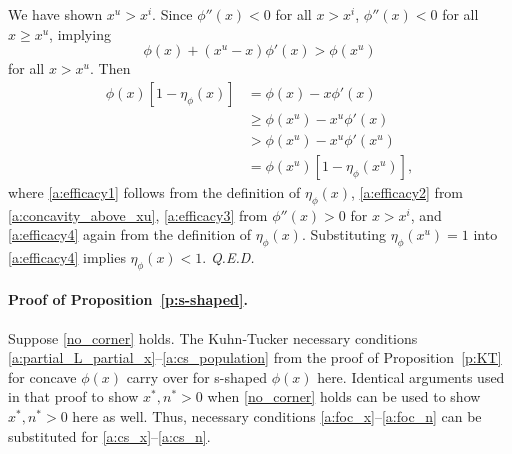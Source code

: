 \documentclass[12pt]{article}
\newcommand{\efficacy}{\phi}
\newcommand{\elasticity}[1]{\eta_{#1}}
\renewcommand{\qed}{{\it Q.E.D.}}
\begin{document}
We have shown $x^u > x^i$. Since $\efficacy''(x) < 0$ for all $x > x^i$, $\efficacy''(x) < 0$ for all $x \geq x^u$, implying 
\begin{equation}
\label{a:concavity_above_xu}
\efficacy(x) + (x^u - x) \efficacy'(x) > \efficacy(x^u)
\end{equation}
for all $x > x^u$. Then
\begin{align}
\efficacy(x) \left[ 1 - \elasticity{\efficacy}(x) \right] & = \efficacy(x) - x \efficacy'(x) \label{a:efficacy1} \\
& \geq \efficacy(x^u) - x^u \efficacy'(x) \label{a:efficacy2} \\
& > \efficacy(x^u) - x^u \efficacy'(x^u) \label{a:efficacy3} \\
& = \efficacy(x^u) \left[ 1 - \elasticity{\efficacy}(x^u) \right], \label{a:efficacy4}
\end{align}
where \eqref{a:efficacy1} follows from the definition of $\elasticity{\efficacy}(x)$, \eqref{a:efficacy2} from \eqref{a:concavity_above_xu}, \eqref{a:efficacy3} from $\efficacy''(x) > 0$ for $x > x^i$, and \eqref{a:efficacy4} again from the definition of $\elasticity{\efficacy}(x)$. Substituting $\elasticity{\efficacy}(x^u) = 1$ into \eqref{a:efficacy4} implies $\elasticity{\efficacy}(x) < 1$. \qed


\paragraph{Proof of Proposition~\ref{p:s-shaped}.}

Suppose \eqref{no_corner} holds. The Kuhn-Tucker necessary conditions \eqref{a:partial_L_partial_x}--\eqref{a:cs_population}  from the proof of Proposition~\ref{p:KT} for concave $\efficacy(x)$ carry over for s-shaped $\efficacy(x)$ here. Identical arguments used in that proof to show $x^*, n^* > 0$ when \eqref{no_corner} holds can be used to show $x^*, n^* > 0$ here as well. Thus, necessary conditions \eqref{a:foc_x}--\eqref{a:foc_n} can be substituted for \eqref{a:cs_x}--\eqref{a:cs_n}. 
\end{document}
